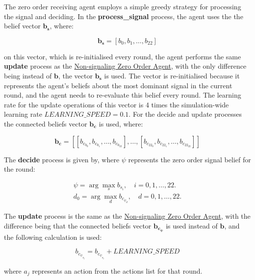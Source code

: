 
The zero order receiving agent employs a simple greedy strategy for processing the signal and deciding. In the \textbf{process\_signal} process, the agent uses the the belief vector $\mathbf{b_s}$, where:

\[
\mathbf{b_s} = [b_{0}, b_{1}, \ldots, b_{22}]
\]

on this vector, which is re-initialised every round, the agent performs the same \textbf{update} process as the \hyperref[eq:zero-order-update]{Non-signaling Zero Order Agent}, with the only difference being instead of $\mathbf{b}$, the vector $\mathbf{b_s}$ is used. The vector is re-initialised because it represents the agent's beliefs about the most dominant signal in the current round, and the agent needs to re-evaluate this belief every round. The learning rate for the update operations of this vector is 4 times the simulation-wide learning rate $LEARNING\_SPEED = 0.1$.
For the decide and update processes the connected beliefs vector $\mathbf{b_c}$ is used, where:

\[
\mathbf{b_c} = [[b_{c_{0_{0}}}, b_{c_{0_{1}}}, \ldots, b_{c_{0_{22}}}], \ldots, [b_{c_{22_{0}}}, b_{c_{22_{1}}}, \ldots, b_{c_{22_{22}}}]]
\]

The \textbf{decide} process is given by, where $\psi$ represents the zero order signal belief for the round:

\begin{equation*}
\begin{aligned}
    \psi = \arg\max_s b_{s_i}, \quad i = 0, 1, \ldots, 22. \\
    d_0 = \arg\max_d b_{c_{{\psi}_d}}, \quad d = 0, 1, \ldots, 22.
\end{aligned}
\end{equation*}

The \textbf{update} process is the same as the \hyperref[eq:zero-order-update]{Non-signaling Zero Order Agent}, with the difference being that the connected beliefs vector $\mathbf{b_{c_\psi}}$ is used instead of $\mathbf{b}$, and the following calculation is used:

\begin{equation*}
    b_{c_{\psi_{a_j}}} = b_{c_{\psi_{a_j}}} + LEARNING\_SPEED
\end{equation*}

where $a_j$ represents an action from the actions list for that round.


